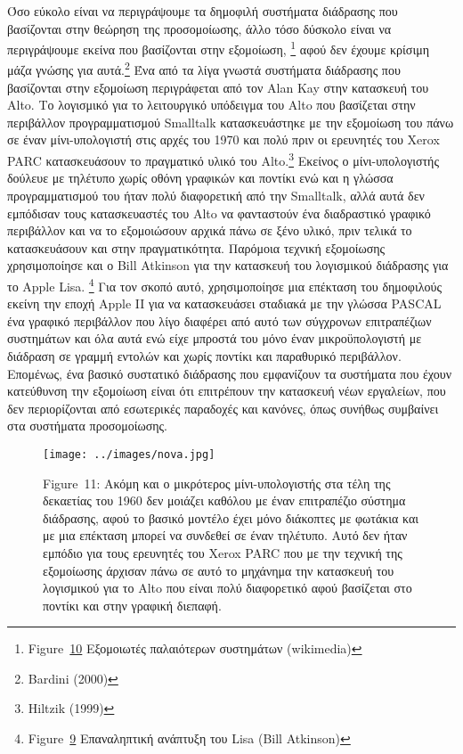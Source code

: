 \documentclass[
]{article}
\begin{document}
Όσο εύκολο είναι να περιγράψουμε τα δημοφιλή συστήματα διάδρασης που
βασίζονται στην θεώρηση της προσομοίωσης, άλλο τόσο δύσκολο είναι να
περιγράψουμε εκείνα που βασίζονται στην εξομοίωση, \footnote{Figure~\protect\hyperlink{fig:emulators}{10}
  Εξομοιωτές παλαιότερων συστημάτων (wikimedia)} αφού δεν έχουμε κρίσιμη
μάζα γνώσης για αυτά.\footnote{Bardini (2000)} Ένα από τα λίγα γνωστά
συστήματα διάδρασης που βασίζονται στην εξομοίωση περιγράφεται από τον
Alan Kay στην κατασκευή του Alto. Το λογισμικό για το λειτουργικό
υπόδειγμα του Alto που βασίζεται στην περιβάλλον προγραμματισμού
Smalltalk κατασκευάστηκε με την εξομοίωση του πάνω σε έναν
μίνι-υπολογιστή στις αρχές του 1970 και πολύ πριν οι ερευνητές του Xerox
PARC κατασκευάσουν το πραγματικό υλικό του Alto.\footnote{Hiltzik (1999)}
Εκείνος ο μίνι-υπολογιστής δούλευε με τηλέτυπο χωρίς οθόνη γραφικών και
ποντίκι ενώ και η γλώσσα προγραμματισμού του ήταν πολύ διαφορετική από
την Smalltalk, αλλά αυτά δεν εμπόδισαν τους κατασκευαστές του Alto να
φανταστούν ένα διαδραστικό γραφικό περιβάλλον και να το εξομοιώσουν
αρχικά πάνω σε ξένο υλικό, πριν τελικά το κατασκευάσουν και στην
πραγματικότητα. Παρόμοια τεχνική εξομοίωσης χρησιμοποίησε και ο Bill
Atkinson για την κατασκευή του λογισμικού διάδρασης για το Apple Lisa.
\footnote{Figure~\protect\hyperlink{fig:lisa-bootstrapping}{9}
  Επαναληπτική ανάπτυξη του Lisa (Bill Atkinson)} Για τον σκοπό αυτό,
χρησιμοποίησε μια επέκταση του δημοφιλούς εκείνη την εποχή Apple II για
να κατασκευάσει σταδιακά με την γλώσσα PASCAL ένα γραφικό περιβάλλον που
λίγο διαφέρει από αυτό των σύγχρονων επιτραπέζιων συστημάτων και όλα
αυτά ενώ είχε μπροστά του μόνο έναν μικροϋπολογιστή με διάδραση σε
γραμμή εντολών και χωρίς ποντίκι και παραθυρικό περιβάλλον. Επομένως,
ένα βασικό συστατικό διάδρασης που εμφανίζουν τα συστήματα που έχουν
κατεύθυνση την εξομοίωση είναι ότι επιτρέπουν την κατασκευή νέων
εργαλείων, που δεν περιορίζονται από εσωτερικές παραδοχές και κανόνες,
όπως συνήθως συμβαίνει στα συστήματα προσομοίωσης.

\leavevmode{}%
\begin{figure}
\hypertarget{fig:nova}{%
\centering
\texttt{[image: ../images/nova.jpg]}
\caption{Figure~11: Ακόμη και ο μικρότερος μίνι-υπολογιστής στα τέλη της
δεκαετίας του 1960 δεν μοιάζει καθόλου με έναν επιτραπέζιο σύστημα
διάδρασης, αφού το βασικό μοντέλο έχει μόνο διάκοπτες με φωτάκια και με
μια επέκταση μπορεί να συνδεθεί σε έναν τηλέτυπο. Αυτό δεν ήταν εμπόδιο
για τους ερευνητές του Xerox PARC που με την τεχνική της εξομοίωσης
άρχισαν πάνω σε αυτό το μηχάνημα την κατασκευή του λογισμικού για το
Alto που είναι πολύ διαφορετικό αφού βασίζεται στο ποντίκι και στην
γραφική διεπαφή.}\label{fig:nova}
}
\end{figure}
\end{document}
